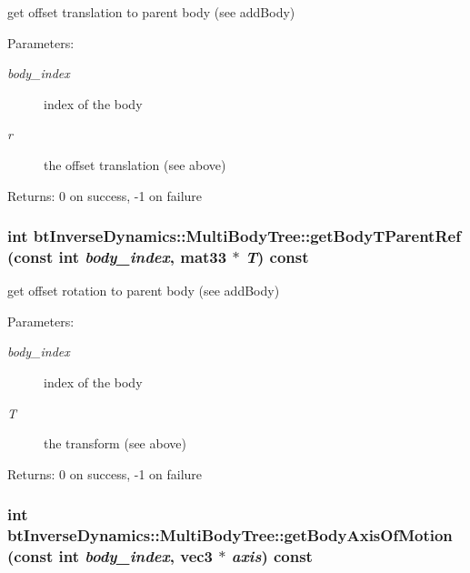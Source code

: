 get offset translation to parent body (see addBody) \begin{Desc}
\item[Parameters:]
\begin{description}
\item[{\em body\_\-index}]index of the body \item[{\em r}]the offset translation (see above) \end{description}
\end{Desc}
\begin{Desc}
\item[Returns:]0 on success, -1 on failure \end{Desc}
\hypertarget{classbt_inverse_dynamics_1_1_multi_body_tree_3781cd90824117bc9f483b4f13b26f1c}{
\subsubsection[getBodyTParentRef]{\setlength{\rightskip}{0pt plus 5cm}int btInverseDynamics::MultiBodyTree::getBodyTParentRef (const int {\em body\_\-index}, \/  mat33 $\ast$ {\em T}) const}}
\label{classbt_inverse_dynamics_1_1_multi_body_tree_3781cd90824117bc9f483b4f13b26f1c}


get offset rotation to parent body (see addBody) \begin{Desc}
\item[Parameters:]
\begin{description}
\item[{\em body\_\-index}]index of the body \item[{\em T}]the transform (see above) \end{description}
\end{Desc}
\begin{Desc}
\item[Returns:]0 on success, -1 on failure \end{Desc}
\hypertarget{classbt_inverse_dynamics_1_1_multi_body_tree_07d19dbfe7c35c0b455b7d58e9f4b014}{
\subsubsection[getBodyAxisOfMotion]{\setlength{\rightskip}{0pt plus 5cm}int btInverseDynamics::MultiBodyTree::getBodyAxisOfMotion (const int {\em body\_\-index}, \/  {\bf vec3} $\ast$ {\em axis}) const}}
\label{classbt_inverse_dynamics_1_1_multi_body_tree_07d19dbfe7c35c0b455b7d58e9f4b014}



